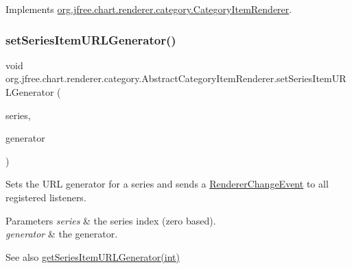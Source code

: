 Implements \mbox{\hyperlink{interfaceorg_1_1jfree_1_1chart_1_1renderer_1_1category_1_1_category_item_renderer_a7d50a8f4cf465adb170d97a905f5160c}{org.\+jfree.\+chart.\+renderer.\+category.\+Category\+Item\+Renderer}}.

\mbox{\label{classorg_1_1jfree_1_1chart_1_1renderer_1_1category_1_1_abstract_category_item_renderer_a8bd0eb808e40ecf16e77228655a0a99d}} 
\subsubsection{\texorpdfstring{set\+Series\+Item\+U\+R\+L\+Generator()}{setSeriesItemURLGenerator()}}
{\footnotesize\ttfamily void org.\+jfree.\+chart.\+renderer.\+category.\+Abstract\+Category\+Item\+Renderer.\+set\+Series\+Item\+U\+R\+L\+Generator (\begin{DoxyParamCaption}\item[{int}]{series,  }\item[{\mbox{\hyperlink{interfaceorg_1_1jfree_1_1chart_1_1urls_1_1_category_u_r_l_generator}{Category\+U\+R\+L\+Generator}}}]{generator }\end{DoxyParamCaption})}

Sets the U\+RL generator for a series and sends a \mbox{\hyperlink{}{Renderer\+Change\+Event}} to all registered listeners.


\begin{DoxyParams}{Parameters}
{\em series} & the series index (zero based). \\
\hline
{\em generator} & the generator.\\
\hline
\end{DoxyParams}
\begin{DoxySeeAlso}{See also}
\mbox{\hyperlink{classorg_1_1jfree_1_1chart_1_1renderer_1_1category_1_1_abstract_category_item_renderer_a8281cfcc9d4be151f6ed682f16cca2a3}{get\+Series\+Item\+U\+R\+L\+Generator(int)}} 
\end{DoxySeeAlso}


